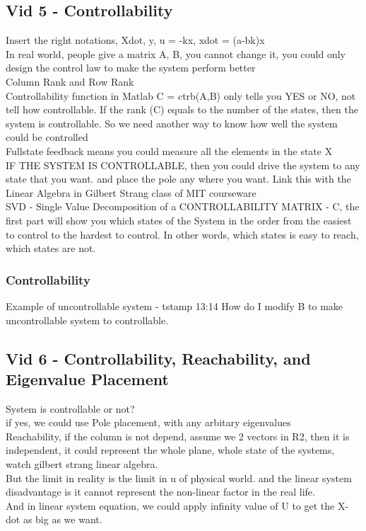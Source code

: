 \documentclass{article}
\begin{document}
\subsection{Vid 5 - Controllability}
Insert the right notations, Xdot, y, u = -kx, xdot = (a-bk)x
\\In real world, people give a matrix A, B, you cannot change it, you could only design the control law to make the system perform better
\\Column Rank and Row Rank
\\Controllability function in Matlab C = ctrb(A,B) only tells you YES or NO, not tell how controllable.
If the rank (C) equals to the number of the states, then the system is controllable.
So we need another way to know how well the system could be controlled
\\Fullstate feedback means you could measure all the elements in the state X
\\IF THE SYSTEM IS CONTROLLABLE, then you could drive the system to any state that you want. and place the pole any where you want.
Link this with the Linear Algebra in Gilbert Strang class of MIT courseware
\\SVD - Single Value Decomposition of a CONTROLLABILITY MATRIX - C, the first part will show you which states of the System
in the order from the easiest to control to the hardest to control.
In other words, which states is easy to reach, which states are not.



\subsubsection{Controllability}
Example of uncontrollable system - tstamp 13:14
How do I modify B to make uncontrollable system to controllable.


\subsection{Vid 6 - Controllability, Reachability, and Eigenvalue Placement }
System is controllable or not?
\\if yes, we could use Pole placement, with any arbitary eigenvalues
\\Reachability, if the column is not depend, assume we 2 vectors in R2, then it is independent,
it could represent the whole plane, whole state of the systems, watch gilbert strang linear algebra.
\\But the limit in reality is the limit in u of physical world. and the linear system disadvantage is
it cannot represent the non-linear factor in the real life.
\\And in linear system equation, we could apply infinity value of U to get the X-dot as big as we want.
\end{document}
